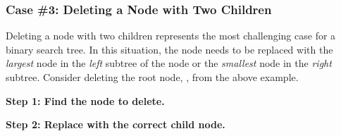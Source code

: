 			\subsubsection*{Case \#3: Deleting a Node with Two Children}
				Deleting a node with two children represents the most challenging case for a binary search tree. In this situation, the node needs to be replaced with the \emph{largest} node in the \emph{left} subtree of the node or the \emph{smallest} node in the \emph{right} subtree. Consider deleting the root node, , from the above example.\\[\baselineskip]
				\begin{minipage}{0.33\textwidth}
					\begin{center}
						\textbf{\footnotesize Step 1: Find the node to delete.}\\[4.5pt]
					\end{center}
				\end{minipage}
				\begin{minipage}{0.33\textwidth}
					\begin{center}
						\textbf{\footnotesize Step 2: Replace with the correct child node.}\\[4.5pt]
					\end{center}
				\end{minipage}
